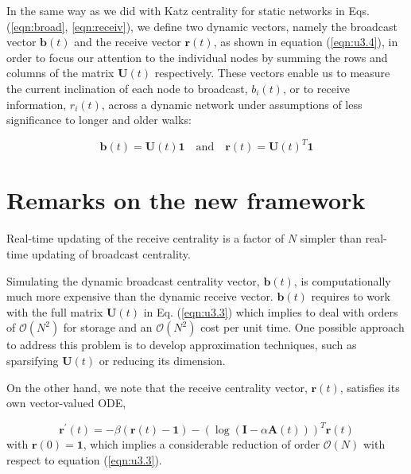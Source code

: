In the same way as we did with Katz centrality for static networks in Eqs. (\ref{eqn:broad}, \ref{eqn:receiv}), we define two dynamic vectors, namely the broadcast vector $\mathbf{b}(t)$ and the receive vector $\mathbf{r}(t)$, as shown in equation (\ref{eqn:u3.4}), in order to focus our attention to the individual nodes by summing the rows and columns of the matrix $\mathbf{U}(t)$ respectively. These vectors enable us to measure the current inclination of each node to broadcast, $b_i(t)$, or to receive information, $r_i(t)$, across a dynamic network under assumptions of less significance to longer and older walks:

\begin{equation}
\label{eqn:u3.4}
    \mathbf{b}(t) = \mathbf{U}(t)\mathbf{1} \text{~~~and~~~} \mathbf{r}(t) = \mathbf{U}(t)^T\mathbf{1}
\end{equation}


\section{Remarks on the new framework}
\label{sec:remarks}

\begin{highlightedParagraphC}
 
Real-time updating of the receive centrality is a factor of $N$ simpler than real-time updating of broadcast centrality.

\end{highlightedParagraphC}

Simulating the dynamic broadcast centrality vector, $\mathbf{b}(t)$, is computationally much more expensive than the dynamic receive vector. $\mathbf{b}(t)$ requires to work with the full matrix $\mathbf{U}(t)$ in Eq. (\ref{eqn:u3.3}) which implies to deal with orders of $\mathcal{O}(N^2)$ for storage and an $\mathcal{O}(N^2)$ cost per unit time. One possible approach to address this problem is to develop approximation techniques, such as sparsifying $\mathbf{U}(t)$ or reducing its dimension.

On the other hand, we note that the receive centrality vector, $\mathbf{r}(t)$, satisfies its own vector-valued ODE, 

\begin{equation}
\label{eqn:u4.1}
    \mathbf{r^{\prime}}(t) = -\beta (\mathbf{r}(t) - \mathbf{1}) - (\log (\mathbf{I} - \alpha \mathbf{A}(t)))^T\mathbf{r}(t)
\end{equation} with $\mathbf{r}(0)=\mathbf{1}$, which implies a considerable reduction of order $\mathcal{O}(N)$ with respect to equation (\ref{eqn:u3.3}).

